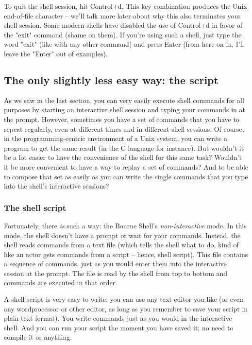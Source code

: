 To quit the shell session, hit Control+d. This key combination produces the
Unix end-of-file character -- we'll talk more later about why this also
terminates your shell session. Some modern shells have disabled the use of
Control+d in favor of the "exit" command (shame on them). If you're using such
a shell, just type the word "exit" (like with any other command) and press
Enter (from here on in, I'll leave the "Enter" out of examples).

\subsection{The only slightly less easy way: the script}
As we saw in the last section, you can very easily execute shell commands for
all purposes by starting an interactive shell session and typing your commands
in at the prompt. However, sometimes you have a set of commands that you have
to repeat regularly, even at different times and in different shell sessions.
Of course, in the programming-centric environment of a Unix system, you can
write a program to get the same result (in the C language for instance). But
wouldn't it be a lot easier to have the convenience of the shell for this same
task? Wouldn't it be more convenient to have a way to replay a set of commands?
And to be able to compose that set as easily as you can write the single
commands that you type into the shell's interactive sessions?

\subsubsection{The shell script}
Fortunately, there \textit{is} such a way: the Bourne Shell's
\textit{non-interactive} mode. In this mode, the shell doesn't have a prompt or
wait for your commands. Instead, the shell reads commands from a text file
(which tells the shell what to do, kind of like an actor gets commands from a
script -- hence, shell script). This file contains a sequence of commands, just
as you would enter them into the interactive session at the prompt. The file is
read by the shell from top to bottom and commands are executed in that order.

A shell script is very easy to write; you can use any text-editor you like (or
even any wordprocessor or other editor, as long as you remember to save your
script in plain text format). You write commands just as you would in the
interactive shell. And you can run your script the moment you have saved it; no
need to compile it or anything.

